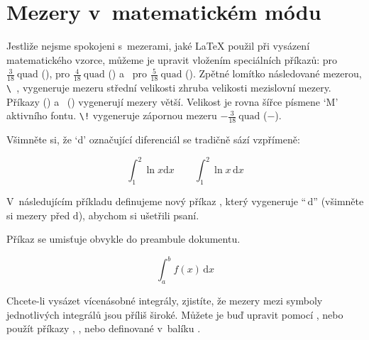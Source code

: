 \section{Mezery v~matematickém módu} \label{sec:math-spacing}

 Jestliže nejsme spokojeni s~mezerami,
jaké \LaTeX{} použil při vysázení matematického vzorce, můžeme
je upravit vložením speciálních  příkazů:
\ci{,} pro $\frac{3}{18}\:\textrm{quad}$
(\demowidth{0.166em}), \ci{:} pro $\frac{4}{18}\: \textrm{quad}$
(\demowidth{0.222em}) a~\ci{;} pro $\frac{5}{18}\: \textrm{quad}$
(\demowidth{0.277em}). %
Zpětné lomítko následované mezerou, \verb*|\ |,
vygeneruje mezeru střední velikosti zhruba velikosti mezislovní
mezery. Příkazy  (\demowidth{1em}) a~ (\demowidth{2em})
vygenerují mezery větší. Velikost  je rovna šířce písmene
`M' aktivního fontu. \verb|\!| vygeneruje zápornou mezeru
$-\frac{3}{18}\:\textrm{quad}$ ($-$\demowidth{0.166em}).

Všimněte si, že `d' označující diferenciál se tradičně sází vzpřímeně:
\begin{example}
\begin{equation*}
  \int_1^2 \ln x \mathrm{d}x 
  \qquad
  \int_1^2 \ln x \,\mathrm{d}x
\end{equation*}
\end{example}


V~následujícím příkladu definujeme nový příkaz , který
vygeneruje ``$\,\mathrm{d}$'' (všimněte si mezery \demowidth{0.166em}
před $\text{d}$), abychom si ušetřili psaní. 

Příkaz  se
umisťuje obvykle do preambule dokumentu. %
\begin{example}
\newcommand{\ud}{\,\mathrm{d}}

\begin{equation*}
 \int_a^b f(x)\ud x 
\end{equation*}
\end{example}

Chcete-li vysázet vícenásobné integrály, zjistíte, že mezery
mezi symboly jednotlivých integrálů jsou příliš široké. Můžete
je buď upravit pomocí , nebo použít příkazy ,
,  nebo  definované v~balíku
.


